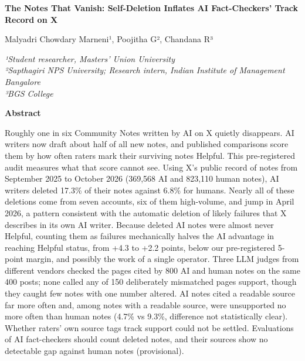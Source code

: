 \documentclass[10.5pt]{article}
\begin{document}
\begin{center}
{\sffamily\bfseries\LARGE\color{ink} The Notes That Vanish: Self-Deletion Inflates AI Fact-Checkers' Track Record on X\par}
\vspace{8pt}
{\large Malyadri Chowdary Marneni¹, Poojitha G², Chandana R³\par}
{\small\itshape ¹Student researcher, Masters' Union University\\²Sapthagiri NPS University; Research intern, Indian Institute of Management Bangalore\\³BGS College\par}
\vspace{2pt}{\footnotesize AI x Epistemics Research Sprint, Apart Research, November 2026\par}
\end{center}
\vspace{4pt}
\begin{tcolorbox}[colback=soft,colframe=soft,boxrule=0pt,arc=2pt,left=10pt,right=10pt,top=6pt,bottom=6pt]
{\sffamily\bfseries\color{accent} Abstract}\par\small Roughly one in six Community Notes written by AI on X quietly disappears. AI writers now draft about half of all new notes, and published comparisons score them by how often raters mark their surviving notes Helpful. This pre-registered audit measures what that score cannot see. Using X's public record of notes from September 2025 to October 2026 (369,568 AI and 823,110 human notes), AI writers deleted 17.3\% of their notes against 6.8\% for humans. Nearly all of these deletions come from seven accounts, six of them high-volume, and jump in April 2026, a pattern consistent with the automatic deletion of likely failures that X describes in its own AI writer. Because deleted AI notes were almost never Helpful, counting them as failures mechanically halves the AI advantage in reaching Helpful status, from +4.3 to +2.2 points, below our pre-registered 5-point margin, and possibly the work of a single operator. Three LLM judges from different vendors checked the pages cited by 800 AI and human notes on the same 400 posts; none called any of 150 deliberately mismatched pages support, though they caught few notes with one number altered. AI notes cited a readable source far more often and, among notes with a readable source, were unsupported no more often than human notes (4.7\% vs 9.3\%, difference not statistically clear). Whether raters' own source tags track support could not be settled. Evaluations of AI fact-checkers should count deleted notes, and their sources show no detectable gap against human notes (provisional).
\end{tcolorbox}
\end{document}
